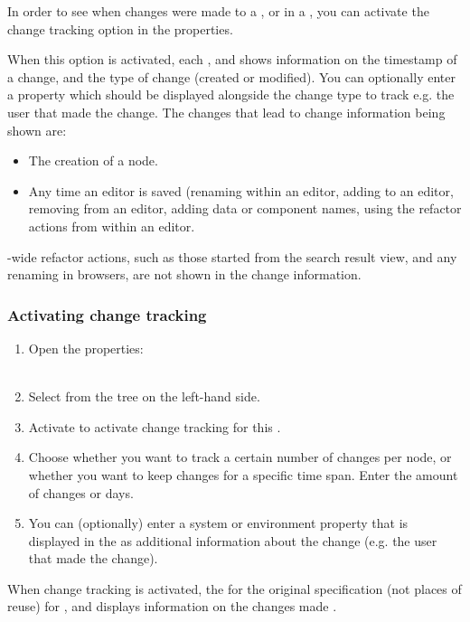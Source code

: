 In order to see when changes were made to a \gdcase{}, \gdsuite{} or \gdjob{} in a \gdproject{}, you can activate the change tracking option in the \gdproject{} properties. 

When this option is activated, each \gdcase{}, \gdsuite{} and \gdjob{} shows information on the timestamp of a change, and the type of change (created or modified). You can optionally enter a property which should be displayed alongside the change type to track e.g. the user that made the change. The changes that lead to change information being shown are:
\begin{itemize}
\item The creation of a node.
\item Any time an editor is saved (renaming within an editor, adding \gdcases{} to an editor, removing \gdcases{} from an editor, adding data or component names, using the refactor actions from within an editor. 
\end{itemize}
\gdproject{}-wide refactor actions, such as those started from the search result view, and any renaming in browsers, are not shown in the change information. 

\subsubsection{Activating change tracking}

\begin{enumerate}
\item Open the \gdproject{} properties:\\
\\
\item Select  from the tree on the left-hand side.
\item Activate  to activate change tracking for this \gdproject{}. 
\item Choose whether you want to track a certain number of changes per node, or whether you want to keep changes for a specific time span. Enter the amount of changes or days. 
\item You can (optionally) enter a system or environment property that is displayed in the \gdpropview{} as additional information about the change (e.g. the user that made the change).
\end{enumerate}
 When change tracking is activated, the \gdpropview{} for the original specification (not places of reuse) for \gdcases{}, \gdsuites{} and \gdjobs{} displays information on the changes made . 

